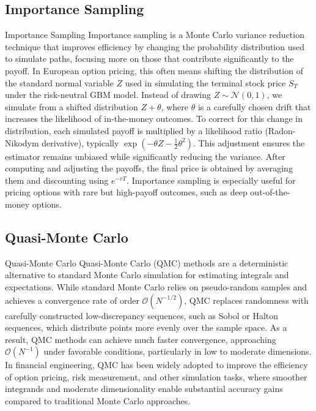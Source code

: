 \documentclass[aspectratio=169,xcolor=dvipsnames]{beamer}
\begin{document}
	\subsection{Importance Sampling}
	\begin{frame}{Importance Sampling}
	Importance sampling is a Monte Carlo variance reduction technique that improves efficiency by changing the probability distribution used to simulate paths, focusing more on those that contribute significantly to the payoff. In European option pricing, this often means shifting the distribution of the standard normal variable \( Z \) used in simulating the terminal stock price \( S_T \) under the risk-neutral GBM model. Instead of drawing \( Z \sim \mathcal{N}(0,1) \), we simulate from a shifted distribution \( Z + \theta \), where \( \theta \) is a carefully chosen drift that increases the likelihood of in-the-money outcomes. To correct for this change in distribution, each simulated payoff is multiplied by a likelihood ratio (Radon-Nikodym derivative), typically \( \exp(-\theta Z - \frac{1}{2} \theta^2) \). This adjustment ensures the estimator remains unbiased while significantly reducing the variance. After computing and adjusting the payoffs, the final price is obtained by averaging them and discounting using \( e^{-rT} \). Importance sampling is especially useful for pricing options with rare but high-payoff outcomes, such as deep out-of-the-money options.
	\end{frame}
	
	\subsection{Quasi-Monte Carlo}
	\begin{frame}{Quasi-Monte Carlo}
	Quasi-Monte Carlo (QMC) methods are a deterministic alternative to standard Monte Carlo simulation for estimating integrals and expectations. While standard Monte Carlo relies on pseudo-random samples and achieves a convergence rate of order \( \mathcal{O}(N^{-1/2}) \), QMC replaces randomness with carefully constructed low-discrepancy sequences, such as Sobol or Halton sequences, which distribute points more evenly over the sample space. As a result, QMC methods can achieve much faster convergence, approaching \( \mathcal{O}(N^{-1}) \) under favorable conditions, particularly in low to moderate dimensions. In financial engineering, QMC has been widely adopted to improve the efficiency of option pricing, risk measurement, and other simulation tasks, where smoother integrands and moderate dimensionality enable substantial accuracy gains compared to traditional Monte Carlo approaches.
	\end{frame}
\end{document}
